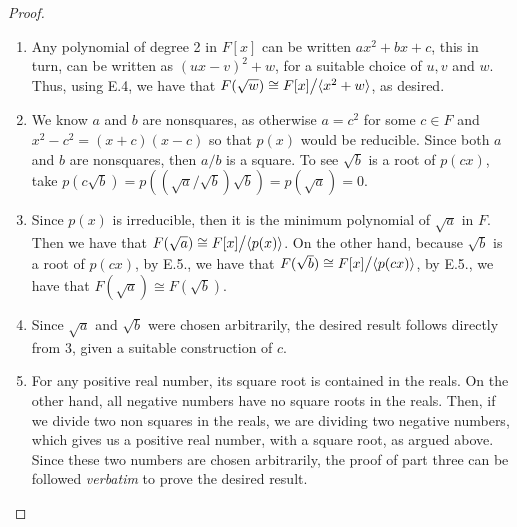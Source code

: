 \begin{proof}
 \begin{enumerate}
     \item Any polynomial of degree 2 in $F[x]$ can be written $ax^2+bx+c$, this in turn, can be written as $(ux-v)^2+w$, for a suitable choice of $u,v$ and $w$. Thus, using E.4, we have that $F(\sqrt{w})\cong{\textstyle F[x]}\big/{\textstyle \langle x^2+w\rangle}$, as desired.
     \item We know $a$ and $b$ are nonsquares, as otherwise $a=c^2$ for some $c\in F$ and $x^2-c^2=(x+c)(x-c)$ so that $p(x)$ would be reducible. Since both $a$ and $b$ are nonsquares, then $a/b$ is a square. To see $\sqrt{b}$ is a root of $p(cx)$, take $p(c\sqrt{b})= p((\sqrt{a}/\sqrt{b})\sqrt{b})=p(\sqrt{a})=0$.
     \item Since $p(x)$ is irreducible, then it is the minimum polynomial of $\sqrt{a}$ in $F$. Then we have that $F(\sqrt{a})\cong{\textstyle F[x]}\big/{\textstyle \langle p(x)\rangle}$. On the other hand, because $\sqrt{b}$ is a root of $p(cx)$, by E.5., we have that $F(\sqrt{b})\cong{\textstyle F[x]}\big/{\textstyle \langle p(cx)\rangle}$, by E.5., we have that $F(\sqrt{a})\cong F(\sqrt{b})$.
    \item Since $\sqrt{a}$ and $\sqrt{b}$ were chosen arbitrarily, the desired result follows directly from 3, given a suitable construction of $c$.
    \item For any positive real number, its square root is contained in the reals. On the other hand, all negative numbers have no square roots in the reals. Then, if we divide two non squares in the reals, we are dividing two negative numbers, which gives us a positive real number, with a square root, as argued above. Since these two numbers are chosen arbitrarily, the proof of part three can be followed \textit{verbatim} to prove the desired result. 

 \end{enumerate}
\end{proof}

